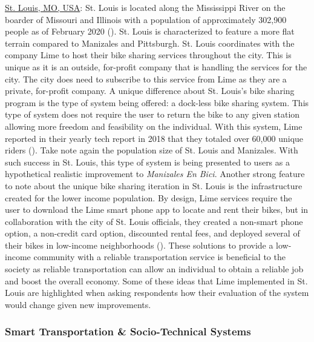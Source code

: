 \documentclass[12pt]{article}
\begin{document}
\underline{St. Louis, MO, USA}: St. Louis is located along the Mississippi River on the boarder of Missouri and Illinois with a population of approximately 302,900 people as of February 2020 (\cite{worldpopulationreviewSTL}). St. Louis is characterized to feature a more flat terrain compared to Manizales and Pittsburgh. St. Louis coordinates with the company Lime to host their bike sharing services throughout the city. This is unique as it is an outside, for-profit company that is handling the services for the city. The city does need to subscribe to this service from Lime as they are a private, for-profit company. A unique difference about St. Louis's bike sharing program is the type of system being offered: a dock-less bike sharing system. This type of system does not require the user to return the bike to any given station allowing more freedom and feasibility on the individual. With this system, Lime reported in their yearly tech report in 2018 that they totaled over 60,000 unique riders (\cite{LimeBike}). Take note again the population size of St. Louis and Manizales. With such success in St. Louis, this type of system is being presented to users as a hypothetical realistic improvement to \textit{Manizales En Bici}. Another strong feature to note about the unique bike sharing iteration in St. Louis is the infrastructure created for the lower income population. By design, Lime services require the user to download the Lime smart phone app to locate and rent their bikes, but in collaboration with the city of St. Louis officials, they created a non-smart phone option, a non-credit card option, discounted rental fees, and deployed several of their bikes in low-income neighborhoods (\cite{gold_2018}). These solutions to provide a low-income community with a reliable transportation service is beneficial to the society as reliable transportation can allow an individual to obtain a reliable job and boost the overall economy. Some of these ideas that Lime implemented in St. Louis are highlighted when asking respondents how their evaluation of the system would change given new improvements. 

\subsubsection*{Smart Transportation \& Socio-Technical Systems}
\end{document}
